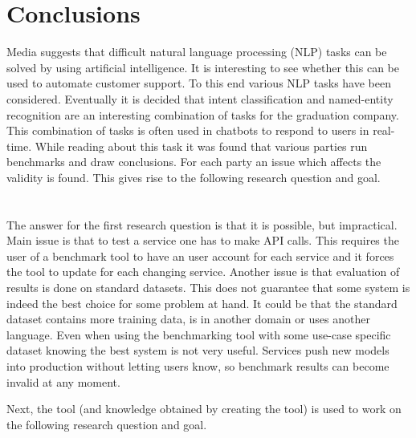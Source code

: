 \chapter{Conclusions}
\label{ch:conclusions}
Media suggests that difficult natural language processing (NLP) tasks can be solved by using artificial intelligence.
It is interesting to see whether this can be used to automate customer support.
To this end various NLP tasks have been considered.
Eventually it is decided that intent classification and named-entity recognition are an interesting combination of tasks for the graduation company.
This combination of tasks is often used in chatbots to respond to users in real-time.
While reading about this task it was found that various parties run benchmarks and draw conclusions.
For each party an issue which affects the validity is found.
This gives rise to the following research question and goal.\\

\rqone\\

\rgone\\

The answer for the first research question is that it is possible, but impractical.
Main issue is that to test a service one has to make API calls.
This requires the user of a benchmark tool to have an user account for each service and it forces the tool to update for each changing service.
Another issue is that evaluation of results is done on standard datasets.
This does not guarantee that some system is indeed the best choice for some problem at hand.
It could be that the standard dataset contains more training data, is in another domain or uses another language.
Even when using the benchmarking tool with some use-case specific dataset knowing the best system is not very useful.
Services push new models into production without letting users know, so benchmark results can become invalid at any moment.

Next, the tool (and knowledge obtained by creating the tool) is used to work on the following research question and goal.\\

\rqtwo\\

\rgtwo\\

